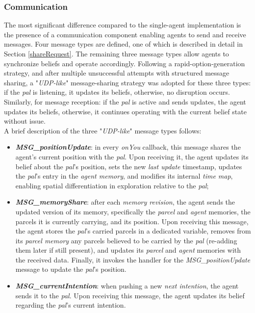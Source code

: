             
        \subsubsection{Communication}            
            The most significant difference compared to the single-agent implementation is the presence of a communication component enabling agents to send and receive messages. Four message types are defined, one of which is described in detail in Section \ref{shareRequest}. The remaining three message types allow agents to synchronize beliefs and operate accordingly. Following a rapid-option-generation strategy, and after multiple unsuccessful attempts with structured message sharing, a "\textit{UDP-like}" message-sharing strategy was adopted for these three types: if the \textit{pal} is listening, it updates its beliefs, otherwise, no disruption occurs. Similarly, for message reception: if the \textit{pal} is active and sends updates, the agent updates its beliefs, otherwise, it continues operating with the current belief state without issue.
            \medskip\\
            A brief description of the three "\textit{UDP-like}" message types follows:
            \begin{itemize}
                \item \textbf{\textit{MSG\_positionUpdate}}: in every \textit{onYou} callback, this message shares the agent's current position with the \textit{pal}. Upon receiving it, the agent updates its belief about the \textit{pal}'s position, sets the new \textit{last update} timestamp, updates the \textit{pal}'s entry in the \textit{agent memory}, and modifies its internal \textit{time map}, enabling spatial differentiation in exploration relative to the \textit{pal};                    
                \item \textbf{\textit{MSG\_memoryShare}}: after each \textit{memory revision}, the agent sends the updated version of its memory, specifically the \textit{parcel} and \textit{agent} memories, the parcels it is currently carrying, and its position. Upon receiving this message, the agent stores the \textit{pal}'s carried parcels in a dedicated variable, removes from its \textit{parcel memory} any parcels believed to be carried by the \textit{pal} (re-adding them later if still present), and updates its \textit{parcel} and \textit{agent} memories with the received data. Finally, it invokes the handler for the \textit{MSG\_positionUpdate} message to update the \textit{pal}'s position.
                \item \textbf{\textit{MSG\_currentIntention}}: when pushing a new \textit{next intention}, the agent sends it to the \textit{pal}. Upon receiving this message, the agent updates its belief regarding the \textit{pal}'s current intention.
            \end{itemize}
            
